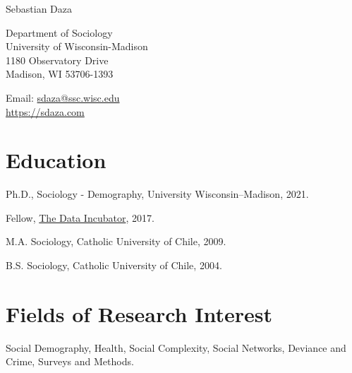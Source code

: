 \documentclass[10pt,letterpaper]{article}
\def\name{Sebastian Daza}
\renewenvironment{itemize}{
  \begin{list}{}{
    \setlength{\leftmargin}{1.5em}
    \setlength{\itemsep}{0.25em}
    \setlength{\parskip}{0pt}
    \setlength{\parsep}{0.25em}
  }
}{
  \end{list}
}
\begin{document}

\centerline{\huge \name}

\bigskip
\bigskip

\begin{minipage}[t]{.75\textwidth}
  Department of Sociology \\
  University of Wisconsin-Madison \\
  1180 Observatory Drive \\
  Madison, WI 53706-1393 \\
\end{minipage}
\begin{minipage}[t]{0.3\textwidth}
  Email: \href{mailto:sdaza@ssc.wisc.edu}{sdaza@ssc.wisc.edu} \\
  \href{https://sdaza.com/}{https://sdaza.com} \\

\end{minipage}

\bigskip
\bigskip

\section*{Education}

\begin{itemize}
  \item Ph.D., Sociology - Demography, University Wisconsin--Madison, 2021.
  \item Fellow, \href{https://www.thedataincubator.com/fellowship.html}{The Data Incubator}, 2017.
  \item M.A. Sociology, Catholic University of Chile, 2009.
  \item B.S. Sociology, Catholic University of Chile, 2004.
\end{itemize}

\section*{Fields of Research Interest}

\begin{itemize}
\item Social Demography, Health, Social Complexity, Social Networks, Deviance and Crime, Surveys and Methods.
\end{itemize}
\end{document}

